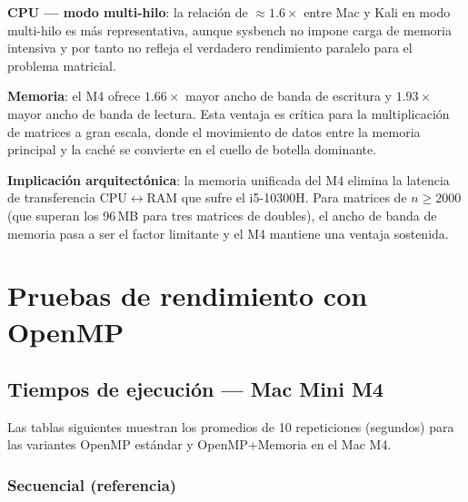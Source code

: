 \documentclass{article}
\begin{document}
\textbf{CPU --- modo multi-hilo}: la relación de $\approx 1.6\times$ entre Mac y Kali en modo multi-hilo es más representativa, aunque sysbench no impone carga de memoria intensiva y por tanto no refleja el verdadero rendimiento paralelo para el problema matricial.

\textbf{Memoria}: el M4 ofrece $1.66\times$ mayor ancho de banda de escritura y $1.93\times$ mayor ancho de banda de lectura. Esta ventaja es crítica para la multiplicación de matrices a gran escala, donde el movimiento de datos entre la memoria principal y la caché se convierte en el cuello de botella dominante.

\textbf{Implicación arquitectónica}: la memoria unificada del M4 elimina la latencia de transferencia CPU$\leftrightarrow$RAM que sufre el i5-10300H. Para matrices de $n \geq 2000$ (que superan los 96\,MB para tres matrices de doubles), el ancho de banda de memoria pasa a ser el factor limitante y el M4 mantiene una ventaja sostenida.

\section{Pruebas de rendimiento con OpenMP}
\label{sec:openmp}

\subsection{Tiempos de ejecución --- Mac Mini M4}

Las tablas siguientes muestran los promedios de 10 repeticiones (segundos) para las variantes OpenMP estándar y OpenMP+Memoria en el Mac M4.

\subsubsection{Secuencial (referencia)}
\end{document}
